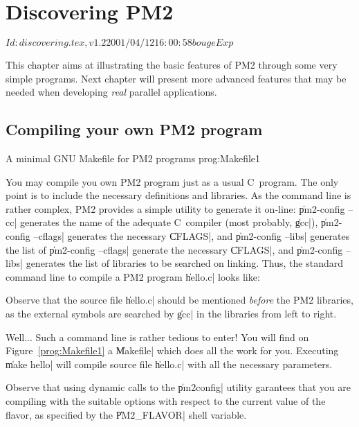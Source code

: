 \chapter{Discovering PM2}

\stamp $Id: discovering.tex,v 1.2 2001/04/12 16:00:58 bouge Exp $

This chapter aims at illustrating the basic features of PM2 through
some very simple programs. Next chapter will present more advanced
features that may be needed when developing \emph{real} parallel
applications.

\section{Compiling your own PM2 program}

 {A minimal GNU Makefile for PM2
  programs} {prog:Makefile1}

You may compile you own PM2 program just as a usual C~program. The
only point is to include the necessary definitions and libraries.  As
the command line is rather complex, PM2 provides a simple utility to
generate it on-line: \|pm2-config --cc| generates the name of the
adequate C~compiler (most probably, \|gcc|), \|pm2-config --cflags|
generates the necessary \|CFLAGS|, and \|pm2-config --libs| generates
the list of \|pm2-config --cflags| generate the necessary \|CFLAGS|,
and \|pm2-config --libs| generates the list of libraries to be
searched on linking. Thus, the standard command line to compile a PM2
program \|hello.c| looks like:
Observe that the source file \|hello.c| should be mentioned
\emph{before} the PM2 libraries, as the external symbols are searched by
\|gcc| in the libraries from left to right.

Well... Such a command line is rather tedious to enter! You will find
on Figure~\ref{prog:Makefile1} a \|Makefile| which does all the work
for you. Executing \|make hello| will compile source file \|hello.c|
with all the necessary parameters.

Observe that using dynamic calls to the \|pm2config| utility garantees
that you are compiling with the suitable options with respect to the
current value of the flavor, as specified by the \|PM2_FLAVOR|
shell variable.

